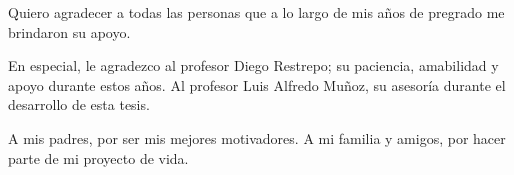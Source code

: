 \begin{acknowledgements}
Quiero agradecer a todas las personas que a lo largo de mis años de pregrado me brindaron su apoyo.

En especial, le agradezco al profesor Diego Restrepo; su paciencia, amabilidad y apoyo durante estos años. 
Al profesor Luis Alfredo Muñoz, su asesoría durante el desarrollo de esta tesis. 

A mis padres, por ser mis mejores motivadores.
A mi familia y amigos, por hacer parte de mi proyecto de vida.
\end{acknowledgements}
